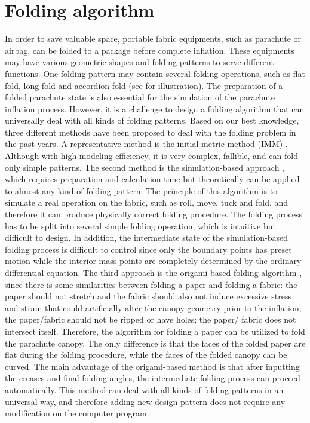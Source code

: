 \section{Folding algorithm}
In order to save valuable space, portable fabric equipments, such as parachute
or airbag, can be folded to a package before complete inflation. These
equipments may have various geometric shapes and folding patterns to serve
different functions. One folding pattern may contain several folding operations, such as flat fold, long fold and accordion fold (see  for illustration). 
The preparation of a folded parachute state is also essential for the simulation of the parachute inflation process. However, it is a challenge to design a folding algorithm that can universally deal with all kinds of folding patterns. Based on our best knowledge, three different methods have been proposed to deal with the folding problem in the past years. A representative method is the initial metric method (IMM) \cite{Tanavde1995Airbag, Zhang2005Airbag, Zhan2014Initial}. 
Although with high modeling efficiency, it is very complex, fallible, and can fold only simple patterns. 
The second method is the simulation-based approach \cite{Hayashi2013Jfold, Hayashi2014Jfold,
Taylor2015Using}, which requires preparation and calculation time but theoretically can be
applied to almost any kind of folding pattern. The principle of this algorithm is to simulate a real operation on the fabric, such as roll, move, tuck and fold, and therefore it can produce physically correct folding procedure. The folding process has to be split into several simple folding operation, which is intuitive but difficult to design. In addition, the intermediate state of the simulation-based folding process is difficult to control since only the boundary points has preset motion while the interior mass-points are completely determined by the ordinary differential equation. 
The third approach is the origami-based folding algorithm \cite{Hull2002Mathematical, Tachi2009Simulation, Xi2014Folding, Demaine1999Folding}, since there is some similarities between folding a paper and folding a fabric: the paper should not stretch and the fabric should also not induce 
excessive stress and strain that could artificially alter the canopy geometry
prior to the inflation; the paper/fabric should not be ripped or have holes; the paper/ fabric 
does not intersect itself. Therefore, the algorithm for folding a paper can be utilized to fold the parachute canopy. The only difference is that the faces of the folded paper are flat during the folding procedure, while the faces of the folded canopy can be curved. The main advantage of the origami-based method is that after inputting the creases and final folding angles, the intermediate folding process can proceed automatically. This method can deal with all kinds of folding patterns in an universal way, and therefore adding new design pattern does not require any modification on the computer program. 
